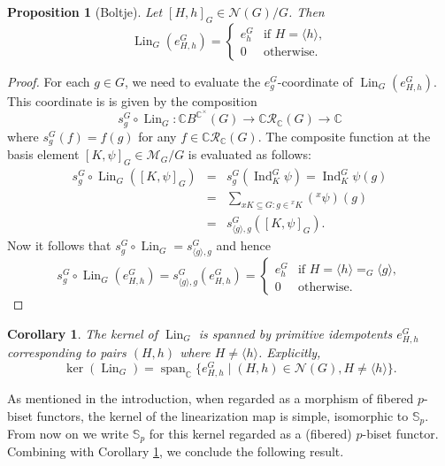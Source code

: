 \documentclass[12pt]{article}
\theoremstyle{plain}
\newtheorem{corollary}[theorem]{Corollary}
\newtheorem{proposition}[theorem]{Proposition}
\theoremstyle{definition}
\newcommand{\ling}{\operatorname{Lin}_G}
\newcommand{\MonG}{\mathbb C B^{\mathbb C^\times}(G)}
\newcommand{\scp}{\mathbb S_p}
\newcommand{\ind}{\operatorname{Ind}}
\begin{document}
\begin{proposition}[Boltje]
    Let $[H, h]_G\in\mathcal N(G)/G$. Then
    \begin{equation*}
    \ling(e_{H, h}^G) = \begin{cases}
              e_h^G & \text{if } H = \langle h\rangle,\\
               0 & \text{otherwise}.
          \end{cases}
\end{equation*}
\end{proposition}
\begin{proof}
   For each $g\in G$, we need to evaluate the $e_g^G$-coordinate of $\ling(e_{H, h}^G)$. This coordinate is is given by the composition 
   \[
   s_g^G\circ \ling: \MonG \to \mathbb C\mathcal R_\mathbb C(G)\to \mathbb C
   \]
   where $s_g^G(f) = f(g)$ for any $f\in \mathbb C\mathcal R_\mathbb C(G)$. The composite function at the basis element $[K, \psi]_G\in \mathcal M_G/G$ is evaluated as follows:
   \begin{eqnarray*}
       s_g^G\circ \ling([K, \psi]_G) &=& s_g^G(\ind_K^G\psi) = \ind_K^G\psi(g)\\
       &=& \sum_{xK\subseteq G:g\in {}^xK}({}^x\psi) (g)\\
       &=& s_{\langle g\rangle, g}^G([K, \psi]_G).
   \end{eqnarray*}
   Now it follows that $s_g^G\circ \ling = s_{\langle g\rangle, g}^G$ and hence
   \[
   s_g^G\circ \ling(e_{H, h}^G) = s_{\langle g\rangle, g}^G(e_{H, h}^G) = \begin{cases}
              e_h^G & \text{if } H = \langle h\rangle =_G \langle g\rangle,\\
               0 & \text{otherwise}.
          \end{cases} 
   \]
\end{proof}
\begin{corollary}\label{cor:ker-ipot}
The kernel of \( \ling \) is spanned by primitive idempotents \( e_{H,h}^G \) corresponding to pairs \( (H, h) \) where \( H \neq \langle h \rangle \). Explicitly,
\[
\ker(\ling) = \operatorname{span}_{\mathbb C}\{ e_{H,h}^G \mid (H,h)\in \mathcal N(G), H \neq \langle h \rangle \}.
\]
\end{corollary}

As mentioned in the introduction, when regarded as a morphism of fibered $p$-biset functors, the kernel of the linearization map is simple, isomorphic to $\scp$. From now on we write $\scp$ for this kernel regarded as a (fibered) $p$-biset functor. 
Combining with Corollary \ref{cor:ker-ipot}, we conclude the following result.
\end{document}
